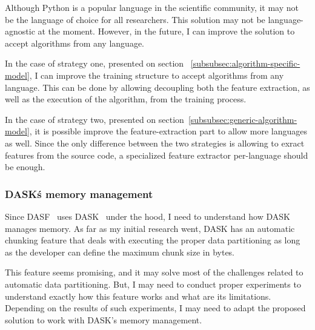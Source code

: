 Although Python is a popular language in the scientific community, it may not be the language of choice for all researchers.
This solution may not be language-agnostic at the moment.
However, in the future, I can improve the solution to accept algorithms from any language.

In the case of strategy one, presented on section ~\ref{subsubsec:algorithm-specific-model}, I can improve the training structure to accept algorithms from any language.
This can be done by allowing decoupling both the feature extraction, as well as the execution of the algorithm, from the training process.

In the case of strategy two, presented on section~\ref{subsubsec:generic-algorithm-model}, it is possible improve the feature-extraction part to allow more languages as well.
Since the only difference between the two strategies is allowing to exract features from the source code, a specialized feature extractor per-language should be enough.

\subsubsection{DASK\'s memory management}

Since DASF~\cite{dasf} uses DASK~\cite{dask} under the hood, I need to understand how DASK manages memory.
As far as my initial research went, DASK has an automatic chunking feature that deals with executing the proper data partitioning as long as the developer can define the maximum chunk size in bytes.

This feature seems promising, and it may solve most of the challenges related to automatic data partitioning.
But, I may need to conduct proper experiments to understand exactly how this feature works and what are its limitations.
Depending on the results of such experiments, I may need to adapt the proposed solution to work with DASK's memory management.
